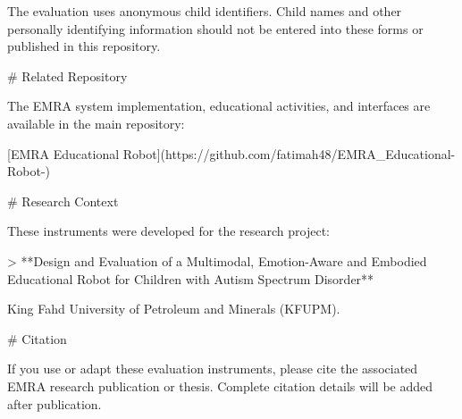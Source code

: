 The evaluation uses anonymous child identifiers. Child names and other personally identifying information should not be entered into these forms or published in this repository.

# Related Repository

The EMRA system implementation, educational activities, and interfaces are available in the main repository:

[EMRA Educational Robot](https://github.com/fatimah48/EMRA_Educational-Robot-)

# Research Context

These instruments were developed for the research project:

> **Design and Evaluation of a Multimodal, Emotion-Aware and Embodied Educational Robot for Children with Autism Spectrum Disorder**

King Fahd University of Petroleum and Minerals (KFUPM).

# Citation

If you use or adapt these evaluation instruments, please cite the associated EMRA research publication or thesis. Complete citation details will be added after publication.
